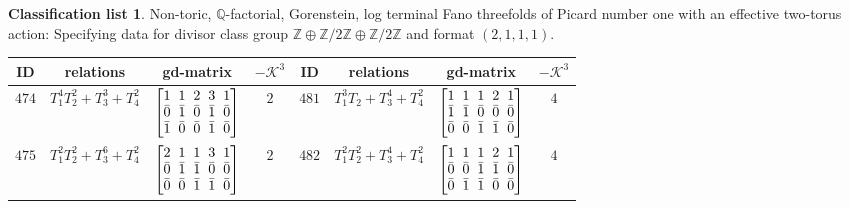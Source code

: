 \documentclass[pdftex]{sigma}%
\theoremstyle{definition}
\newtheorem{class-list}[thm]{Classification list}
\def\ZZ{{\mathbb Z}}
\def\QQ{{\mathbb Q}}
\numberwithin{equation}{section}
\begin{document}
\begin{class-list}
Non-toric, $\QQ$-factorial, Gorenstein, log terminal Fano
threefolds of Picard number one with an effective two-torus action:
Specifying data for divisor class group
$\ZZ\oplus \ZZ/2\ZZ\oplus \ZZ/2\ZZ$ and format $(2,1,1,1)$.
\begin{table}[h!]\centering\setlength{\tabcolsep}{3.5pt}
\renewcommand{\arraystretch}{1.15}\small\tabulinesep=1mm
\begin{tabu}{c|c|c|c||c|c|c|c}
\hline
ID&relations&gd-matrix&$-\mathcal{K}^3$&ID&relations&gd-matrix&$-\mathcal{K}^3$
\\
\hline
${474}$&${T_{1}^{4}T_{2}^{2}+T_{3}^{3}+T_{4}^{2}}$
&$\arraycolsep=1mm\begin{bmatrix}{1} & {1} & {2} & {3} & {1} \\ {\bar{0}} & {\bar{1}} & {\bar{0}} & {\bar{1}} & {\bar{0}} \\ {\bar{1}} & {\bar{0}} & {\bar{0}} & {\bar{1}} & {\bar{0}}\end{bmatrix}$
&${2}$
&${481}$&${T_{1}^{3}T_{2}+T_{3}^{4}+T_{4}^{2}}$
&$\arraycolsep=1mm\begin{bmatrix}{1} & {1} & {1} & {2} & {1} \\ {\bar{1}} & {\bar{1}} & {\bar{0}} & {\bar{0}} & {\bar{0}} \\ {\bar{0}} & {\bar{0}} & {\bar{1}} & {\bar{1}} & {\bar{0}}\end{bmatrix}$
&${4}$
\\
\hline
${475}$&${T_{1}^{2}T_{2}^{2}+T_{3}^{6}+T_{4}^{2}}$
&$\arraycolsep=1mm\begin{bmatrix}{2} & {1} & {1} & {3} & {1} \\ {\bar{0}} & {\bar{1}} & {\bar{1}} & {\bar{0}} & {\bar{0}} \\ {\bar{0}} & {\bar{0}} & {\bar{1}} & {\bar{1}} & {\bar{0}}\end{bmatrix}$
&${2}$
&${482}$&${T_{1}^{2}T_{2}^{2}+T_{3}^{4}+T_{4}^{2}}$
&$\arraycolsep=1mm\begin{bmatrix}{1} & {1} & {1} & {2} & {1} \\ {\bar{0}} & {\bar{0}} & {\bar{1}} & {\bar{1}} & {\bar{0}} \\ {\bar{0}} & {\bar{1}} & {\bar{1}} & {\bar{0}} & {\bar{0}}\end{bmatrix}$
&${4}$
\\
\hline
\end{tabu}\vspace{2mm}
\end{table}


\end{class-list}
\end{document}
